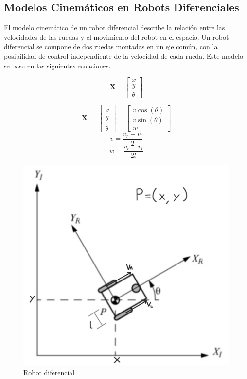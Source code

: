 \documentclass[conference]{IEEEtran}
\begin{document}
\subsection{Modelos Cinemáticos en Robots Diferenciales}

El modelo cinemático de un robot diferencial describe la relación entre las velocidades de las ruedas y el movimiento del robot en el espacio. Un robot diferencial se compone de dos ruedas montadas en un eje común, con la posibilidad de control independiente de la velocidad de cada rueda. Este modelo se basa en las siguientes ecuaciones:

\begin{equation}
\mathbf{X}
=
\begin{bmatrix}
x\\
y\\
\theta
\end{bmatrix}
\end{equation}

\begin{equation}
\dot{\mathbf{X}} \
=
\begin{bmatrix}
\dot{x} \\
\dot{y} \\
\dot{\theta}
\end{bmatrix}
=
\begin{bmatrix}
v \cos(\theta) \\
v \sin(\theta) \\
w
\end{bmatrix}
\end{equation}
\begin{equation}
v = \frac{v_r+v_l}{2}
\end{equation}
\begin{equation}
w = \frac{v_r-v_l}{2l}
\end{equation}
\begin{figure}[h!]
    \centering
    \includegraphics[width=0.5\linewidth]{Robotdiff.png}
    \caption{Robot diferencial}
    \label{fig:imagen de robot diferencial}
\end{figure}
\end{document}
